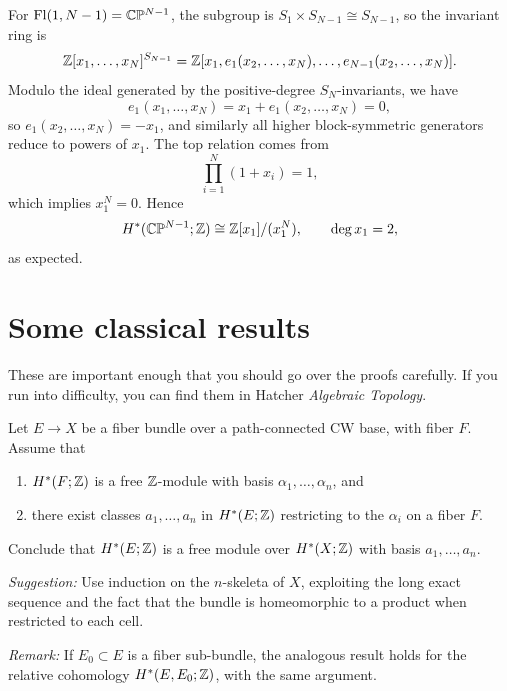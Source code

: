 \documentclass[12pt]{article}  %
\begin{document}
\begin{solution}
\medskip

For \(\operatorname{Fl}(1,N-1)=\mathbb{C}\mathbb{P}^{N-1}\), the subgroup is \(S_1\times S_{N-1}\cong S_{N-1}\), so the invariant ring is
\[
\mathbb{Z}[x_1,\dots,x_N]^{S_{N-1}}
=
\mathbb{Z}[x_1,e_1(x_2,\dots,x_N),\dots,e_{N-1}(x_2,\dots,x_N)].
\]
Modulo the ideal generated by the positive-degree \(S_N\)-invariants, we have
\[
e_1(x_1,\dots,x_N)=x_1+e_1(x_2,\dots,x_N)=0,
\]
so \(e_1(x_2,\dots,x_N)=-x_1\), and similarly all higher block-symmetric generators reduce to powers of \(x_1\). The top relation comes from
\[
\prod_{i=1}^N(1+x_i)=1,
\]
which implies \(x_1^N=0\). Hence
\[
H^*(\mathbb{C}\mathbb{P}^{N-1};\mathbb{Z})\cong \mathbb{Z}[x_1]/(x_1^N),
\qquad \deg x_1=2,
\]
as expected.
\end{solution}

\section*{Some classical results}
These are important enough that you should go over the proofs carefully. If you run into difficulty,
you can find them in Hatcher \emph{Algebraic Topology}.

\begin{problem}
Let $E\to X$ be a fiber bundle over a path-connected CW base, with fiber $F$. Assume that
\begin{enumerate}
\item $H^{*}(F;\mathbb{Z})$ is a free $\mathbb{Z}$-module with basis $\alpha_1,\dots,\alpha_n$, and
\item there exist classes $a_1,\dots,a_n$ in $H^{*}(E;\mathbb{Z})$ restricting to the $\alpha_i$ on a fiber $F$.
\end{enumerate}
Conclude that $H^{*}(E;\mathbb{Z})$ is a free module over $H^{*}(X;\mathbb{Z})$ with basis $a_1,\dots,a_n$.

\noindent\textit{Suggestion:} Use induction on the $n$-skeleta of $X$, exploiting the long exact sequence and the fact
that the bundle is homeomorphic to a product when restricted to each cell.

\noindent\textit{Remark:} If $E_0 \subset E$ is a fiber sub-bundle, the analogous result holds for the relative cohomology
$H^{*}(E,E_0;\mathbb{Z})$, with the same argument.
\end{problem}
\end{document}
